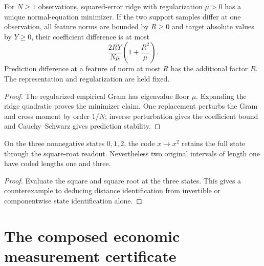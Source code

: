 \begin{theorem}\label{thm:ridge-support-stability}
  \leanok
  For $N\ge1$ observations, squared-error ridge with regularization $\mu>0$
  has a unique normal-equation minimizer. If the two support samples differ
  at one observation, all feature norms are bounded by $R\ge0$ and target
  absolute values by $Y\ge0$, their coefficient difference is at most
  \[
    \frac{2RY}{N\mu}\left(1+\frac{R^2}\mu\right).
  \]
  Prediction difference at a feature of norm at most $R$ has the additional
  factor $R$. The representation and regularization are held fixed.
\end{theorem}
\begin{proof}\leanok
  The regularized empirical Gram has eigenvalue floor $\mu$. Expanding the
  ridge quadratic proves the minimizer claim. One replacement perturbs the
  Gram and cross moment by order $1/N$; inverse perturbation gives the
  coefficient bound and Cauchy--Schwarz gives prediction stability.
\end{proof}

\begin{lemma}\label{thm:nonlinear-geometry-limit}
  \leanok
  On the three nonnegative states $0,1,2$, the code $x\mapsto x^2$ retains
  the full state through the square-root readout. Nevertheless two original
  intervals of length one have coded lengths one and three.
\end{lemma}
\begin{proof}\leanok
  Evaluate the square and square root at the three states. This gives a
  counterexample to deducing distance identification from invertible or
  componentwise state identification alone.
\end{proof}

\section{The composed economic measurement certificate}\label{sec:bp-end-to-end}

